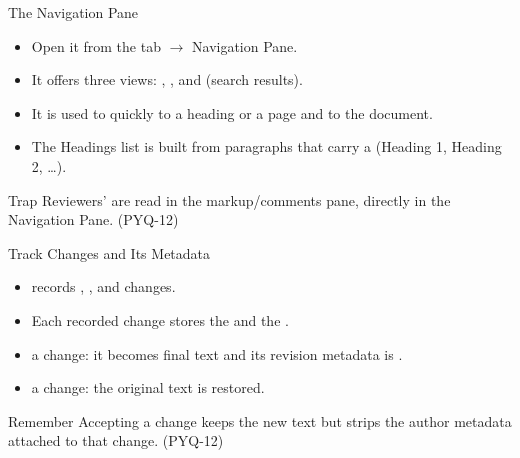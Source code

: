 \documentclass[aspectratio=169]{beamer}
\begin{document}
\begin{frame}{The Navigation Pane}
  \begin{itemize}
    \item Open it from the  tab $\rightarrow$ Navigation Pane.
    \item It offers three views: , , and
       (search results).
    \item It is used to  quickly to a heading or a page and to
       the document.
    \item The Headings list is built from paragraphs that carry a
       (Heading 1, Heading 2, \ldots).
  \end{itemize}
  \begin{alertblock}{Trap}
    Reviewers'  are read in the markup/comments pane,
     directly in the Navigation Pane. (PYQ-12)
  \end{alertblock}
\end{frame}

\begin{frame}{Track Changes and Its Metadata}
  \begin{itemize}
    \item {} records , , and
       changes.
    \item Each recorded change stores the  and the
      .
    \item {} a change: it becomes final text and its revision
      metadata is .
    \item {} a change: the original text is restored.
  \end{itemize}
  \begin{block}{Remember}
    Accepting a change keeps the new text but strips the author metadata
    attached to that change. (PYQ-12)
  \end{block}
\end{frame}
\end{document}
